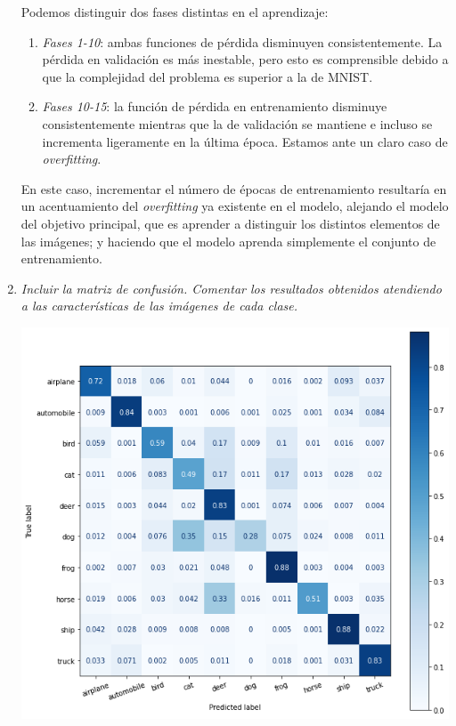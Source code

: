 \documentclass[11pt]{article}
\begin{document}
\begin{enumerate}
        Podemos distinguir dos fases distintas en el aprendizaje:
        \begin{enumerate}
            \item \emph{Fases 1-10}: ambas funciones de pérdida disminuyen consistentemente. La pérdida en validación es más inestable, pero esto es comprensible debido a que la complejidad del problema es superior a la de MNIST.
            \item \emph{Fases 10-15}: la función de pérdida en entrenamiento disminuye consistentemente mientras que la de validación se mantiene e incluso se incrementa ligeramente en la última época. Estamos ante un claro caso de \emph{overfitting}.
        \end{enumerate}
        En este caso, incrementar el número de épocas de entrenamiento resultaría en un acentuamiento del \emph{overfitting} ya existente en el modelo, alejando el modelo del objetivo principal, que es aprender a distinguir los distintos elementos de las imágenes; y haciendo que el modelo aprenda simplemente el conjunto de entrenamiento.


    \item \emph{Incluir la matriz de confusión. Comentar los resultados obtenidos atendiendo a las características de las imágenes de cada clase.}
        \begin{center}
            \includegraphics[scale = 0.5]{imgs/cifar_confusion_matrix.png}
        \end{center}
        

\end{enumerate}
\end{document}
